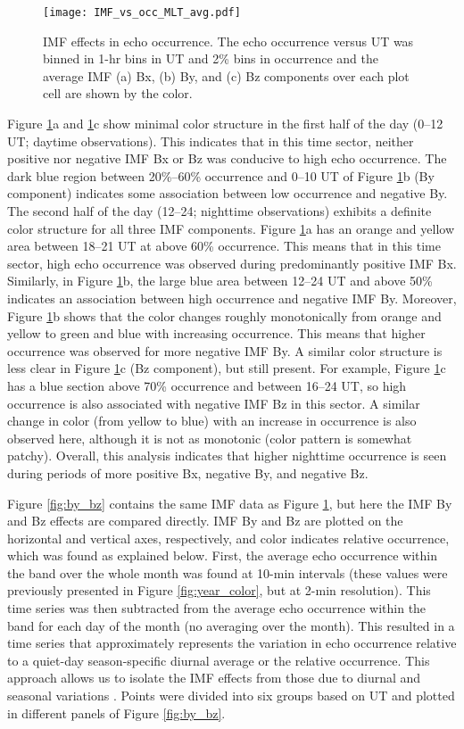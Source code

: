 \begin{figure}
\texttt{[image: IMF\_vs\_occ\_MLT\_avg.pdf]}
\caption{IMF effects in echo occurrence. The echo occurrence versus UT was binned in 1-hr bins in UT and 2\% bins in occurrence and the average IMF (a) Bx, (b) By, and (c) Bz components over each plot cell are shown by the color.}
\label{fig:ut_occ}
\end{figure}

Figure \ref{fig:ut_occ}a and \ref{fig:ut_occ}c show minimal color structure in the first half of the day (0--12 UT; daytime observations). This indicates that in this time sector, neither positive nor negative IMF Bx or Bz was conducive to high echo occurrence. The dark blue region between 20\%--60\% occurrence and 0--10 UT of Figure \ref{fig:ut_occ}b (By component) indicates some association between low occurrence and negative By. The second half of the day (12--24; nighttime observations) exhibits a definite color structure for all three IMF components. Figure \ref{fig:ut_occ}a has an orange and yellow area between 18--21 UT at above 60\% occurrence. This means that in this time sector, high echo occurrence was observed during predominantly positive IMF Bx. Similarly, in Figure \ref{fig:ut_occ}b, the large blue area between 12--24 UT and above 50\% indicates an association between high occurrence and negative IMF By. Moreover, Figure \ref{fig:ut_occ}b shows that the color changes roughly monotonically from orange and yellow to green and blue with increasing occurrence. This means that higher occurrence was observed for more negative IMF By. A similar color structure is less clear in Figure \ref{fig:ut_occ}c (Bz  component), but still present. For example, Figure \ref{fig:ut_occ}c has a blue section above 70\% occurrence and between 16--24 UT, so high occurrence is also associated with negative IMF Bz in this sector. A similar change in color (from yellow to blue) with an increase in occurrence is also observed here, although it is not as monotonic (color pattern is somewhat patchy). Overall, this analysis indicates that higher nighttime occurrence is seen during periods of more positive Bx, negative By, and negative Bz.

Figure \ref{fig:by_bz} contains the same IMF data as Figure \ref{fig:ut_occ}, but here the IMF By and Bz effects are compared directly. IMF By and Bz are plotted on the horizontal and vertical axes, respectively, and color indicates relative occurrence, which was found as explained below. First, the average echo occurrence within the band over the whole month was found at 10-min intervals (these values were previously presented in Figure \ref{fig:year_color}, but at 2-min resolution). This time series was then subtracted from the average echo occurrence within the band for each day of the month (no averaging over the month). This resulted in a time series that approximately represents the variation in echo occurrence relative to a quiet-day season-specific diurnal average or the relative occurrence. This approach allows us to isolate the IMF effects from those due to diurnal and seasonal variations \citep{Makarevich2012}. Points were divided into six groups based on UT and plotted in different panels of Figure \ref{fig:by_bz}.

